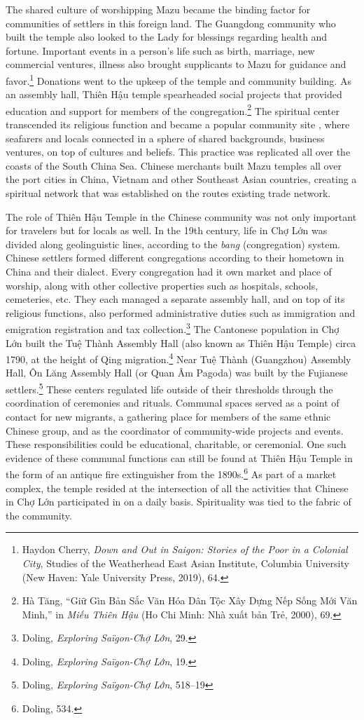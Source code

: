 The shared culture of worshipping Mazu became the binding factor for communities of settlers in this foreign land. The Guangdong community who built the temple also looked to the Lady for blessings regarding health and fortune. Important events in a person’s life such as birth, marriage, new commercial ventures, illness also brought supplicants to Mazu for guidance and favor.\footnote{Haydon Cherry, \textit{Down and Out in Saigon: Stories of the Poor in a Colonial City}, Studies of the Weatherhead East Asian Institute, Columbia University (New Haven: Yale University Press, 2019), 64.} Donations went to the upkeep of the temple and community building. As an assembly hall, Thiên Hậu temple spearheaded social projects that provided education and support for members of the congregation.\footnote{Hà Tăng, “Giữ Gìn Bản Sắc Văn Hóa Dân Tộc Xây Dựng Nếp Sống Mới Văn Minh,” in \textit{Miếu Thiên Hậu} (Ho Chi Minh: Nhà xuất bản Trẻ, 2000), 69.} The spiritual center transcended its religious function and became a popular community site , where seafarers and locals connected in a sphere of shared backgrounds, business ventures, on top of cultures and beliefs. This practice was replicated all over the coasts of the South China Sea. Chinese merchants built Mazu temples all over the port cities in China, Vietnam and other Southeast Asian countries, creating a spiritual network that was established on the routes existing trade network.

\vi The role of Thiên Hậu Temple in the Chinese community was not only important for travelers but for locals as well. In the 19th century, life in Chợ Lớn was divided along geolinguistic lines, according to the \textit{bang} (congregation) system. Chinese settlers formed different congregations according to their hometown in China and their dialect. Every congregation had it own market and place of worship, along with other collective properties such as hospitals, schools, cemeteries, etc. They each managed a separate assembly hall, and on top of its religious functions, also performed administrative duties such as immigration and emigration registration and tax collection.\footnote{Doling, \textit{Exploring Saïgon-Chợ Lớn}, 29.} The Cantonese population in Chợ Lớn built the Tuệ Thành Assembly Hall (also known as Thiên Hậu Temple) circa 1790, at the height of Qing migration.\footnote{Doling, \textit{Exploring Saïgon-Chợ Lớn}, 19.} Near Tuệ Thành (Guangzhou) Assembly Hall, Ôn Lăng Assembly Hall (or Quan Âm Pagoda) was built by the Fujianese settlers.\footnote{Doling, \textit{Exploring Saïgon-Chợ Lớn}, 518–19} These centers regulated life outside of their thresholds through the coordination of ceremonies and rituals. Communal spaces served as a point of contact for new migrants, a gathering place for members of the same ethnic Chinese group, and as the coordinator of community-wide projects and events. These responsibilities could be educational, charitable, or ceremonial. One such evidence of these communal functions can still be found at Thiên Hậu Temple in the form of an antique fire extinguisher from the 1890s.\footnote{Doling, 534.} As part of a market complex, the temple resided at the intersection of all the activities that Chinese in Chợ Lớn participated in on a daily basis. Spirituality was tied to the fabric of the community.

